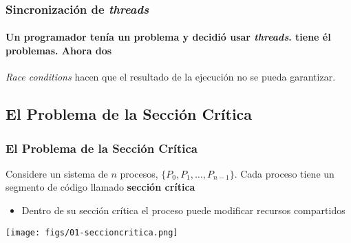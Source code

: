 \documentclass[letter]{beamer}
\begin{document}
\begin{frame}
  \frametitle{Sincronización de {\em threads}}
  \framesubtitle{Un programador tenía un problema y decidió usar {\em threads}. tiene él problemas. Ahora dos }

  {\em Race conditions} hacen que el resultado de la ejecución no se pueda garantizar.
  
  
   
\end{frame}
\subsection{El Problema de la Sección Crítica}

\begin{frame}
  \frametitle{El Problema de la Sección Crítica}

  Considere un sistema de $n$ procesos, $\{P_0,P_1,\ldots,P_{n-1}\}$.
  Cada proceso tiene un segmento de código llamado {\bf sección crítica}
  \begin{itemize}
    \item Dentro de su sección crítica el proceso puede modificar recursos compartidos
  \end{itemize}
  
  
  \begin{center}
    \texttt{[image: figs/01-seccioncritica.png]}
  \end{center}
  
\end{frame}
\end{document}
